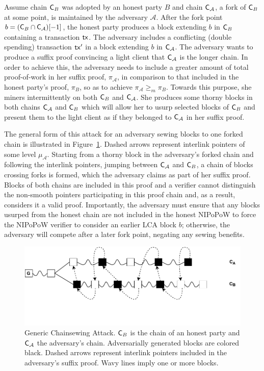 Assume chain $\mathsf{C}_B$ was adopted by an honest party $B$ and chain $\mathsf{C}_\mathcal{A}$, a fork of $\mathsf{C}_B$ at some point, is maintained by the adversary $\mathcal{A}$. After the fork point $b = (\mathsf{C}_B \cap \mathsf{C}_\mathcal{A})[-1]$, the honest party produces a block extending $b$ in $\mathsf{C}_B$ containing a transaction $\mathsf{tx}$. The adversary includes a conflicting (double spending) transaction $\mathsf{tx}'$ in a block extending $b$ in $\mathsf{C}_\mathcal{A}$.
The adversary wants to produce a suffix proof convincing a light client that $\mathsf{C}_\mathcal{A}$ is the longer chain. In order to achieve this, the adversary needs to include a greater amount of total proof-of-work in her suffix proof, $\pi_\mathcal{A}$, in comparison to that included in the honest party's proof, $\pi_B$, so as to achieve $\pi_\mathcal{A} \geq_m \pi_B$. Towards this purpose, she miners intermittently on both $\mathsf{C}_B$ and $\mathsf{C}_\mathcal{A}$. She produces some thorny blocks in both chains $\mathsf{C}_\mathcal{A}$ and $\mathsf{C}_B$ which will allow her to usurp selected blocks of $\mathsf{C}_B$ and present them to the light client as if they belonged to $\mathsf{C}_\mathcal{A}$ in her suffix proof.

The general form of this attack for an adversary sewing blocks to one forked chain is illustrated in Figure~\ref{fig:generic_attack}. Dashed arrows represent interlink pointers of some level $\mu_\mathcal{A}$. Starting from a thorny block in the adversary's forked chain and following the interlink pointers, jumping between $\mathsf{C}_\mathcal{A}$ and $\mathsf{C}_B$, a chain of blocks crossing forks is formed, which the adversary claims as part of her suffix proof. Blocks of both chains are included in this proof and a verifier cannot distinguish the non-smooth pointers participating in this proof chain and, as a result, considers it a valid proof. Importantly, the adversary must ensure that any blocks usurped from the honest chain are not included in the honest NIPoPoW to force the NIPoPoW verifier to consider an earlier LCA block $b$; otherwise, the adversary will compete after a later fork point, negating any sewing benefits.

\begin{figure}[h]
	\begin{center}
		\includegraphics[width=0.9\columnwidth
		]{figures/generic_chainsewing_attack.pdf}
	\end{center}
	\caption{Generic Chainsewing Attack. $\mathsf{C}_B$ is the chain of an honest party and $\mathsf{C}_\mathcal{A}$ the adversary's chain. Adversarially generated blocks are 	colored black. Dashed arrows represent interlink pointers included in the	adversary's suffix proof. Wavy lines imply one or more blocks.}
	\label{fig:generic_attack}
\end{figure}

